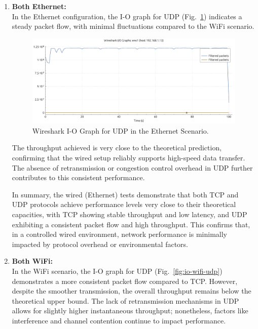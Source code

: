 \begin{enumerate}
    \item \textbf{Both Ethernet:} \\
    In the Ethernet configuration, the I-O graph for UDP (Fig.~\ref{fig:io-eth-udp}) indicates a steady packet flow, with minimal fluctuations compared to the WiFi scenario.
    
    \begin{figure}[ht]
        \centering
        \includegraphics[width=0.9\columnwidth]{images/graphs/I-O/I-O_ETH_UDP.pdf}
        \caption{Wireshark I-O Graph for UDP in the Ethernet Scenario.}
        \label{fig:io-eth-udp}
    \end{figure}

    The throughput achieved is very close to the theoretical prediction, confirming that the wired setup reliably supports high-speed data transfer. The absence of retransmission or congestion control overhead in UDP further contributes to this consistent performance.
    
    In summary, the wired (Ethernet) tests demonstrate that both TCP and UDP protocols achieve performance levels very close to their theoretical capacities, with TCP showing stable throughput and low latency, and UDP exhibiting a consistent packet flow and high throughput. This confirms that, in a controlled wired environment, network performance is minimally impacted by protocol overhead or environmental factors.

    \item \textbf{Both WiFi:} \\
    In the WiFi scenario, the I-O graph for UDP (Fig.~\ref{fig:io-wifi-udp}) demonstrates a more consistent packet flow compared to TCP. However, despite the smoother transmission, the overall throughput remains below the theoretical upper bound. The lack of retransmission mechanisms in UDP allows for slightly higher instantaneous throughput; nonetheless, factors like interference and channel contention continue to impact performance.
    

\end{enumerate}
